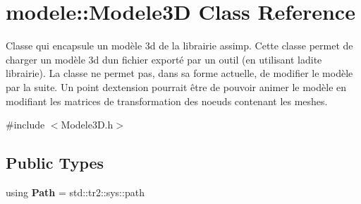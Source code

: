 \hypertarget{classmodele_1_1_modele3_d}{}\section{modele\+:\+:Modele3\+D Class Reference}
\label{classmodele_1_1_modele3_d}


Classe qui encapsule un modèle 3d de la librairie \textquotesingle{}assimp\textquotesingle{}. Cette classe permet de charger un modèle 3d d\textquotesingle{}un fichier exporté par un outil (en utilisant ladite librairie). La classe ne permet pas, dans sa forme actuelle, de modifier le modèle par la suite. Un point d\textquotesingle{}extension pourrait être de pouvoir animer le modèle en modifiant les matrices de transformation des noeuds contenant les meshes.  




{\ttfamily \#include $<$Modele3\+D.\+h$>$}

\subsection*{Public Types}
\begin{DoxyCompactItemize}
\item 
\hypertarget{classmodele_1_1_modele3_d_ab4241072ebd395ca1b9b6958ab8359cb}{}using {\bfseries Path} = std\+::tr2\+::sys\+::path\label{classmodele_1_1_modele3_d_ab4241072ebd395ca1b9b6958ab8359cb}

\end{DoxyCompactItemize}
